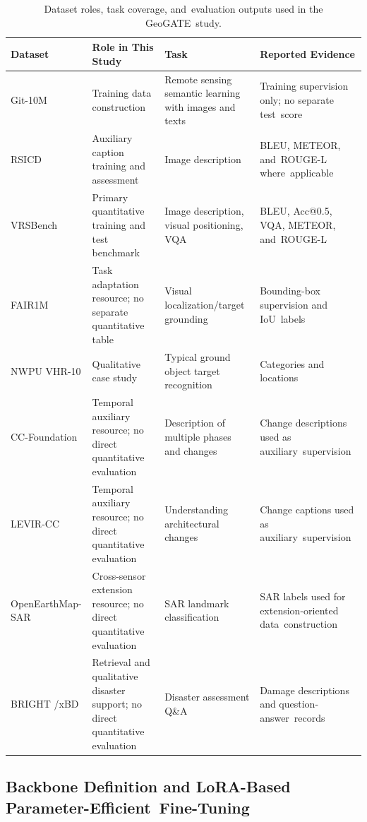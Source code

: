 \documentclass[applsci,article,accept,moreauthors]{Definitions/mdpi}
\begin{document}
\begin{table}[H]
\caption{Dataset roles, task coverage, and~evaluation outputs used in the GeoGATE~study.\label{tab1}}
\small
\begin{tabularx}{\textwidth}{m{2cm}<{\raggedright}LLL}
\toprule
\textbf{Dataset} & \textbf{Role in This Study} & \textbf{Task} & \textbf{Reported Evidence} \\
\midrule
Git-10M & Training data construction & Remote sensing semantic learning with images and texts & Training supervision only; no separate test~score \\
\midrule
RSICD & Auxiliary caption training and assessment & Image description & BLEU, METEOR, and~ROUGE-L where~applicable \\
\midrule
VRSBench & Primary quantitative training and test benchmark & Image description, visual positioning, VQA & BLEU, Acc@0.5, VQA, METEOR, and~ROUGE-L \\
\midrule
FAIR1M \citep{ref1} & Task adaptation resource; no separate quantitative table & Visual localization/target grounding & Bounding-box supervision and IoU~labels \\
\midrule
NWPU VHR-10 & Qualitative case study & Typical ground object target recognition & Categories and locations \\
\midrule
CC-Foundation & Temporal auxiliary resource; no direct quantitative evaluation & Description of multiple phases and changes & Change descriptions used as auxiliary~supervision \\
\midrule
LEVIR-CC & Temporal auxiliary resource; no direct quantitative evaluation & Understanding architectural changes & Change captions used as auxiliary~supervision \\
\midrule
OpenEarthMap-SAR & Cross-sensor extension resource; no direct quantitative evaluation & SAR landmark classification & SAR labels used for extension-oriented data~construction \\
\midrule
BRIGHT \citep{ref2}/xBD & Retrieval and qualitative disaster support; no direct quantitative evaluation & Disaster assessment Q\&A & Damage descriptions and question-answer~records \\

\bottomrule
\end{tabularx}
\end{table}


\subsection{Backbone Definition and LoRA-Based Parameter-Efficient~Fine-Tuning}
\end{document}
